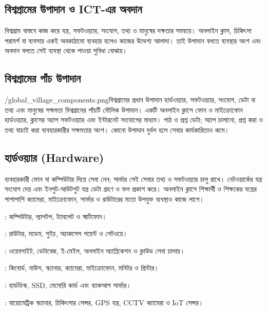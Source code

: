 \begin{topicbody}
\section{বিশ্বগ্রামের উপাদান ও ICT-এর অবদান}
\label{sec:ch1-components}
বিশ্বগ্রাম বাস্তবে কাজ করে যন্ত্র, সফটওয়্যার, সংযোগ, তথ্য ও মানুষের দক্ষতার সমন্বয়ে। অনলাইন ক্লাস, চিকিৎসা পরামর্শ বা ব্যবসায় একই অবকাঠামো ব্যবহার হলেও কাজের উদ্দেশ্য আলাদা। তাই উপাদান বলতে ব্যবস্থার অংশ এবং অবদান বলতে সেই ব্যবস্থা থেকে পাওয়া সুবিধা বোঝায়।

\subsection{বিশ্বগ্রামের পাঁচ উপাদান}
\begin{rightimageblock}{\chaponeimg/global_village_components.png}{বিশ্বগ্রামের প্রধান উপাদান}
হার্ডওয়্যার, সফটওয়্যার, সংযোগ, ডেটা বা তথ্য এবং মানুষের সক্ষমতা বিশ্বগ্রামের পাঁচটি মৌলিক উপাদান। একটি অনলাইন ক্লাসে ফোন ও মাইক্রোফোন হার্ডওয়্যার, ক্লাসের অ্যাপ সফটওয়্যার এবং ইন্টারনেট সংযোগের মাধ্যম। পাঠ ও প্রশ্ন ডেটা; অ্যাপ চালানো, প্রশ্ন করা ও তথ্য যাচাই করা ব্যবহারকারীর সক্ষমতার অংশ। কোনো উপাদান দুর্বল হলে সেবার কার্যকারিতাও কমে।
\end{rightimageblock}\label{fig:ch1-pair-5}

\subsection{হার্ডওয়্যার (Hardware)}
ব্যবহারকারী ফোন বা কম্পিউটার দিয়ে সেবা নেন; সার্ভার সেই সেবার তথ্য ও সফটওয়্যার চালু রাখে। নেটওয়ার্কের যন্ত্র সংযোগ দেয় এবং ইনপুট-আউটপুট যন্ত্র ডেটা গ্রহণ ও ফল প্রকাশ করে। অনলাইন ক্লাসে শিক্ষার্থী ও শিক্ষকের যন্ত্রের পাশাপাশি ক্যামেরা, মাইক্রোফোন, সার্ভার ও রাউটারের মতো উপযুক্ত ব্যবস্থাও কাজে লাগে।
\begin{compactpoints}
\item {}: কম্পিউটার, ল্যাপটপ, ট্যাবলেট ও স্মার্টফোন।
\item {}: রাউটার, মডেম, সুইচ, অ্যাকসেস পয়েন্ট ও গেটওয়ে।
\item {}: ওয়েবসাইট, ডেটাবেজ, ই-মেইল, অনলাইন অ্যাপ্লিকেশন ও ক্লাউড সেবা চালায়।
\item {}: কিবোর্ড, মাউস, স্ক্যানার, ক্যামেরা, মাইক্রোফোন, মনিটর ও প্রিন্টার।
\item {}: হার্ডডিস্ক, SSD, মেমোরি কার্ড এবং ব্যাকআপ সার্ভার।
\item {}: বায়োমেট্রিক স্ক্যানার, চিকিৎসার সেন্সর, GPS যন্ত্র, CCTV ক্যামেরা ও IoT সেন্সর।
\end{compactpoints}


\end{topicbody}
